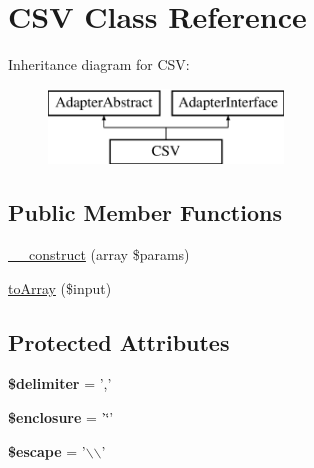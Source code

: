 \hypertarget{class_anemo_1_1_import_1_1_adapter_1_1_c_s_v}{
\section{CSV Class Reference}
\label{class_anemo_1_1_import_1_1_adapter_1_1_c_s_v}
}
Inheritance diagram for CSV:\begin{figure}[H]
\begin{center}
\leavevmode
\includegraphics[height=2.000000cm]{class_anemo_1_1_import_1_1_adapter_1_1_c_s_v}
\end{center}
\end{figure}
\subsection*{Public Member Functions}
\begin{DoxyCompactItemize}
\item 
\hyperlink{class_anemo_1_1_import_1_1_adapter_1_1_c_s_v_a718439be52019287a30ceebdf25c1adc}{\_\-\_\-construct} (array \$params)
\item 
\hyperlink{class_anemo_1_1_import_1_1_adapter_1_1_c_s_v_a75416ddc6d147a0aaca83783f838403a}{toArray} (\$input)
\end{DoxyCompactItemize}
\subsection*{Protected Attributes}
\begin{DoxyCompactItemize}
\item 
\hypertarget{class_anemo_1_1_import_1_1_adapter_1_1_c_s_v_a40acc7b8c08cfbb456cd9444cb0e8f61}{
{\bfseries \$delimiter} = ','}
\label{class_anemo_1_1_import_1_1_adapter_1_1_c_s_v_a40acc7b8c08cfbb456cd9444cb0e8f61}

\item 
\hypertarget{class_anemo_1_1_import_1_1_adapter_1_1_c_s_v_a207ba7fe12aff1e8948477350b4cc43f}{
{\bfseries \$enclosure} = '\char`\"{}'}
\label{class_anemo_1_1_import_1_1_adapter_1_1_c_s_v_a207ba7fe12aff1e8948477350b4cc43f}

\item 
\hypertarget{class_anemo_1_1_import_1_1_adapter_1_1_c_s_v_ae3182affcf46f62a8b0e212db22597a1}{
{\bfseries \$escape} = '$\backslash$$\backslash$'}
\label{class_anemo_1_1_import_1_1_adapter_1_1_c_s_v_ae3182affcf46f62a8b0e212db22597a1}

\end{DoxyCompactItemize}


